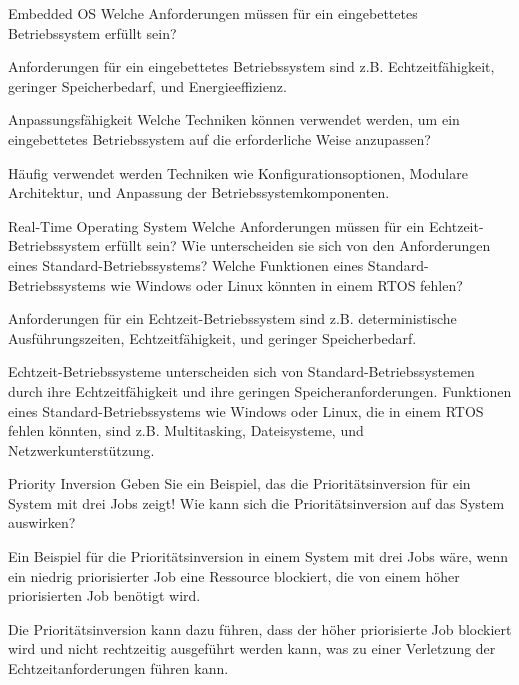\documentclass{article}
\begin{document}

\begin{exercise}{Embedded OS}
  Welche Anforderungen müssen für ein eingebettetes Betriebssystem erfüllt sein?

  \begin{solution}
    Anforderungen für ein eingebettetes Betriebssystem sind z.B. Echtzeitfähigkeit, geringer Speicherbedarf, und Energieeffizienz.
  \end{solution}
\end{exercise}

\begin{exercise}{Anpassungsfähigkeit}
  Welche Techniken können verwendet werden, um ein eingebettetes Betriebssystem auf die erforderliche Weise anzupassen?

  \begin{solution}
    Häufig verwendet werden Techniken wie Konfigurationsoptionen, Modulare Architektur, und Anpassung der Betriebssystemkomponenten.
  \end{solution}
\end{exercise}

\begin{exercise}{Real-Time Operating System}
  Welche Anforderungen müssen für ein Echtzeit-Betriebssystem erfüllt sein? Wie unterscheiden sie sich von den Anforderungen eines Standard-Betriebssystems? Welche Funktionen eines Standard-Betriebssystems wie Windows oder Linux könnten in einem RTOS fehlen?

  \begin{solution}
    Anforderungen für ein Echtzeit-Betriebssystem sind z.B. deterministische Ausführungszeiten, Echtzeitfähigkeit, und geringer Speicherbedarf.

    Echtzeit-Betriebssysteme unterscheiden sich von Standard-Betriebssystemen durch ihre Echtzeitfähigkeit und ihre geringen Speicheranforderungen. Funktionen eines Standard-Betriebssystems wie Windows oder Linux, die in einem RTOS fehlen könnten, sind z.B. Multitasking, Dateisysteme, und Netzwerkunterstützung.
  \end{solution}
\end{exercise}

\begin{exercise}{Priority Inversion}
  Geben Sie ein Beispiel, das die Prioritätsinversion für ein System mit drei Jobs zeigt! Wie kann sich die Prioritätsinversion auf das System auswirken?

  \begin{solution}
    Ein Beispiel für die Prioritätsinversion in einem System mit drei Jobs wäre, wenn ein niedrig priorisierter Job eine Ressource blockiert, die von einem höher priorisierten Job benötigt wird.

    Die Prioritätsinversion kann dazu führen, dass der höher priorisierte Job blockiert wird und nicht rechtzeitig ausgeführt werden kann, was zu einer Verletzung der Echtzeitanforderungen führen kann.
  \end{solution}
\end{exercise}
\end{document}
